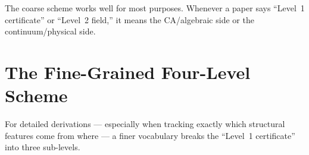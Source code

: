 \documentclass[11pt,a4paper]{article}
\begin{document}
\noindent
The coarse scheme works well for most purposes.
Whenever a paper says ``Level~1 certificate'' or ``Level~2 field,''
it means the CA/algebraic side or the continuum/physical side.

\section{The Fine-Grained Four-Level Scheme}
\label{sec:fine}

For detailed derivations --- especially when tracking exactly which structural
features come from where --- a finer vocabulary breaks the ``Level~1 certificate''
into three sub-levels.
\end{document}
